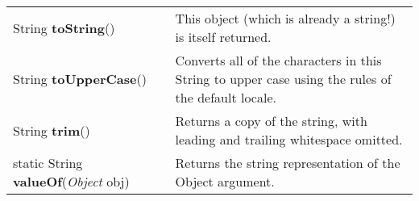 \documentclass[main]{subfiles}
\begin{document}
\begin{longtable}{p{0.4\linewidth} p{0.6\linewidth}}
String  \textbf{toString}() 
& This object (which is already a string!) is itself returned.\\

String  \textbf{toUpperCase}() 
& Converts all of the characters in this String to upper case using the rules of the default locale.\\

String  \textbf{trim}() 
& Returns a copy of the string, with leading and trailing whitespace omitted.\\

static String  \textbf{valueOf}(\textit{Object} obj) 
& Returns the string representation of the Object argument.\\

\end{longtable}
\todo[inline]{}
\end{document}
